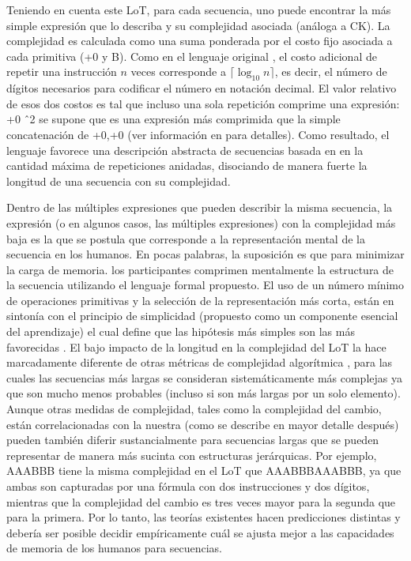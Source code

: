 Teniendo en cuenta este LoT, para cada secuencia, uno puede encontrar la más simple expresión que lo describa y su complejidad asociada (análoga a CK). La complejidad es calculada como una suma ponderada por el costo fijo asociada a cada primitiva (+0 y B). Como en el lenguaje original \cite{amalric2017language}, el costo adicional de repetir una instrucción $n$ veces corresponde a $\lceil \log_{10} n \rceil$, es decir, el número de dígitos necesarios para codificar el número en notación decimal. El valor relativo de esos dos costos es tal que incluso una sola repetición comprime una expresión: +0 \^ \ 2 se supone que es una expresión más comprimida que la simple concatenación de +0,+0 (ver información en \cite{amalric2017language} para detalles). Como resultado, el lenguaje favorece una descripción abstracta de secuencias basada en en la cantidad máxima de repeticiones anidadas, disociando de manera fuerte la longitud de una secuencia con su complejidad.

Dentro de las múltiples expresiones que pueden describir la misma secuencia, la expresión (o en algunos casos, las múltiples expresiones) con la complejidad más baja es la que se postula que corresponde a la representación mental de la secuencia en los humanos. En pocas palabras, la suposición es que para minimizar la carga de memoria. los participantes comprimen mentalmente la estructura de la secuencia utilizando el lenguaje formal propuesto. El uso de un número mínimo de operaciones primitivas y la selección de la representación más corta, están en sintonía con el principio de simplicidad (propuesto como un componente esencial del aprendizaje) el cual define que las hipótesis más simples son las más favorecidas \cite{f32,feldman2003simplicity}. El bajo impacto de la longitud en la complejidad del LoT la hace marcadamente diferente de otras métricas de complejidad algorítmica \cite{f43,f44,f46}, para las cuales las secuencias más largas se consideran sistemáticamente más complejas ya que son mucho menos probables (incluso si son más largas por un solo elemento). Aunque otras medidas de complejidad, tales como la complejidad del cambio, están correlacionadas con la nuestra (como se describe en mayor detalle después) pueden también diferir sustancialmente para secuencias largas que se pueden representar de manera más sucinta con estructuras jerárquicas. Por ejemplo, AAABBB tiene la misma complejidad en el LoT que AAABBBAAABBB, ya que ambas son capturadas por una fórmula con dos instrucciones y dos dígitos, mientras que la complejidad del cambio es tres veces mayor para la segunda que para la primera. Por lo tanto, las teorías existentes hacen predicciones distintas y debería ser posible decidir empíricamente cuál se ajusta mejor a las capacidades de memoria de los humanos para secuencias. 

